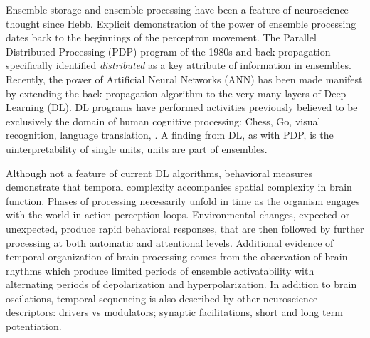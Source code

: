 \documentclass[12pt]{article}
\begin{document}
Ensemble storage and ensemble processing have been a feature of neuroscience thought since Hebb.\cite{Hebb1949-qt}
Explicit demonstration of the power of ensemble processing dates back to the beginnings of the perceptron movement.\cite{Rosenblatt1958-ff}
The Parallel Distributed Processing (PDP) program of the 1980s and back-propagation specifically identified {\em distributed} as a key attribute of information in
ensembles.\cite{Hinton1986-vi,Rumelhart1986-ko} Recently, the power of Artificial Neural Networks (ANN)
has been made manifest by extending the back-propagation algorithm to the very many layers of Deep Learning (DL). DL programs have performed activities previously believed to be
exclusively the domain of human cognitive processing: Chess, Go, visual recognition, language translation, \etc.
A finding from DL, as with PDP, is the uinterpretability of single units, units are part of ensembles.


Although not a feature of current DL algorithms, behavioral measures demonstrate that temporal complexity accompanies spatial complexity in brain function.
Phases of processing necessarily unfold in time as the organism engages with the world in action-perception loops.\cite{Little2013-wn}
Environmental changes, expected or unexpected, produce rapid behavioral responses, that are then followed by further processing at both automatic and attentional levels.
Additional evidence of temporal organization of brain processing comes from the observation of brain
rhythms which produce limited periods of ensemble activatability with alternating periods of depolarization and hyperpolarization.
In addition to brain oscilations, temporal sequencing is also described by other neuroscience descriptors:
drivers vs modulators; synaptic facilitations, short and long term potentiation.

\end{document}
